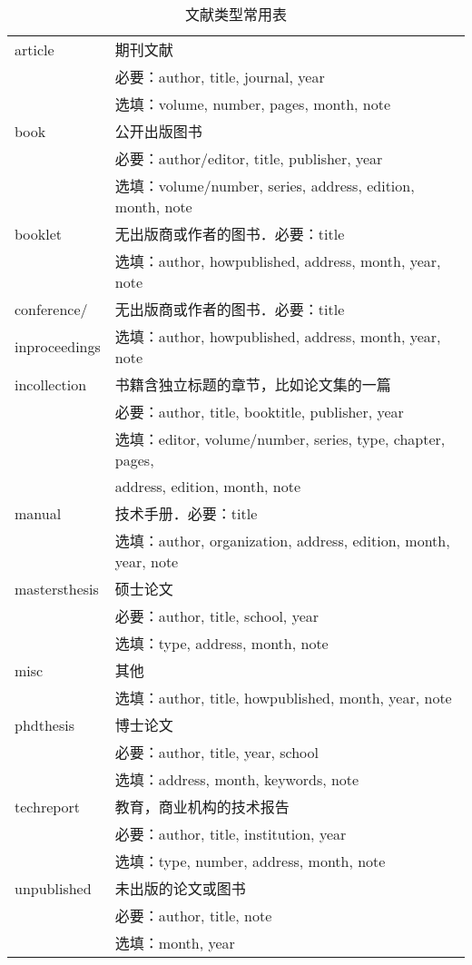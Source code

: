 \begin{table}[!htb]
\centering
\caption{\bibtex 文献类型常用表}
\label{tab:bibtype}
\begin{tabular}{>{\ttfamily}ll}
\hline
article & 期刊文献 \\
& 必要：author, title, journal, year \\
& 选填：volume, number, pages, month, note \\
\hline
book & 公开出版图书 \\
& 必要：author/editor, title, publisher, year \\
& 选填：volume/number, series, address, edition, month, note \\
\hline
booklet & 无出版商或作者的图书．必要：title\\
& 选填：author, howpublished, address, month, year, note \\
\hline
conference/ & 无出版商或作者的图书．必要：title \\
inproceedings & 选填：author, howpublished, address, month, year, note \\
\hline
incollection & 书籍含独立标题的章节，比如论文集的一篇 \\
& 必要：author, title, booktitle, publisher, year \\
& 选填：editor, volume/number, series, type, chapter, pages, \\
& address, edition, month, note \\
\hline
manual & 技术手册．必要：title \\
& 选填：author, organization, address, edition, month, year, note \\
\hline
mastersthesis & 硕士论文\\
& 必要：author, title, school, year \\
& 选填：type, address, month, note\\
\hline
misc & 其他 \\
& 选填：author, title, howpublished, month, year, note \\
\hline
phdthesis & 博士论文 \\
& 必要：author, title, year, school\\
& 选填：address, month, keywords, note\\
\hline
techreport & 教育，商业机构的技术报告\\
& 必要：author, title, institution, year\\
& 选填：type, number, address, month, note\\
\hline
unpublished & 未出版的论文或图书\\
& 必要：author, title, note\\
& 选填：month, year\\
\hline
\end{tabular}
\end{table}

